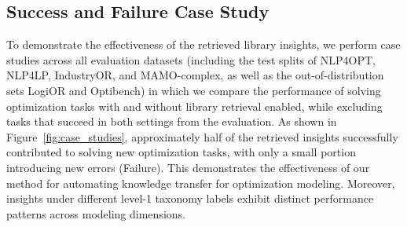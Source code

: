 \documentclass[sigconf, nonacm]{acmart}
\begin{document}

\subsection{Success and Failure Case Study\label{appendix:case_study}}
To demonstrate the effectiveness of the retrieved library insights, we perform case studies across all evaluation datasets (including the test splits of NLP4OPT, NLP4LP, IndustryOR, and MAMO-complex, as well as the out-of-distribution sets LogiOR and Optibench) in which we compare the performance of solving optimization tasks with and without library retrieval enabled, while excluding tasks that succeed in both settings from the evaluation. As shown in Figure~\ref{fig:case_studies}, approximately half of the retrieved insights successfully contributed to solving new optimization tasks, with only a small portion introducing new errors (Failure). This demonstrates the effectiveness of our method for automating knowledge transfer for optimization modeling. Moreover, insights under different level-1 taxonomy labels exhibit distinct performance patterns across modeling dimensions.
\end{document}
